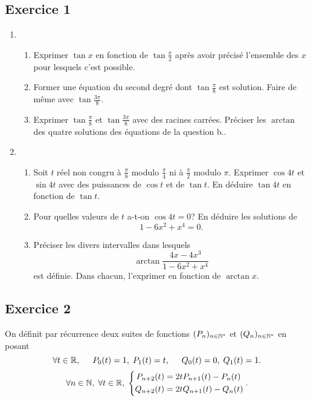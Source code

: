 
\subsection*{Exercice 1}
\begin{enumerate}
  \item 
  \begin{enumerate}
    \item Exprimer $\tan x$ en fonction de $\tan \frac{x}{2}$ après avoir précisé l'ensemble des $x$ pour lesquels c'est possible.
    \item Former une équation du second degré dont $\tan \frac{\pi}{8}$ est solution. Faire de même avec $\tan \frac{3\pi}{8}$.
    \item Exprimer $\tan \frac{\pi}{8}$ et $\tan \frac{3\pi}{8}$ avec des racines carrées. Préciser les $\arctan$ des quatre solutions des équations de la question b..  
  \end{enumerate}

\item
\begin{enumerate}
  \item  Soit $t$ réel non congru {\`a} $\frac{\pi }{8}$ modulo $\frac{\pi }{4}$ ni {\`a} $\frac{\pi }{2}$ modulo $\pi$.\newline
Exprimer $\cos 4t$ et $\sin 4t$ avec des puissances de $\cos t$ et de $\tan t$. En déduire $\tan 4t$ en fonction de $\tan t$.
 
  \item Pour quelles valeurs de $t$ a-t-on $\cos 4t = 0$? En déduire les solutions de 
\[
  1 - 6x^2 + x^4 = 0.
\]
 
  \item  Préciser les divers intervalles dans lesquels
\[\arctan \frac{4x-4x^{3}}{1-6x^{2}+x^{4}}\]
est définie. Dans chacun, l'exprimer en fonction de $\arctan x$.
\end{enumerate}
\end{enumerate}

\subsection*{Exercice 2}
On d{\'e}finit par r{\'e}currence deux suites de fonctions $(P_{n})_{n\in \mathbb{N}^{*}}$ et $(Q_{n})_{n\in \mathbb{N}^{*}}$ en
posant
\[
\forall t \in \mathbb{R},\hspace{0.5cm} P_{0}(t) = 1,\; P_{1}(t) = t,\hspace{0.5cm} Q_{0}(t) = 0,\;  Q_{1}(t) = 1.
\]
\[
\forall n \in \mathbb{N},\; \forall t \in \mathbb{R},\; 
\left\lbrace
\begin{aligned}
P_{n+2}(t) &= 2tP_{n+1}(t) - P_{n}(t) \\
Q_{n+2}(t) &= 2tQ_{n+1}(t) - Q_{n}(t)
\end{aligned}
\right. .
\]

